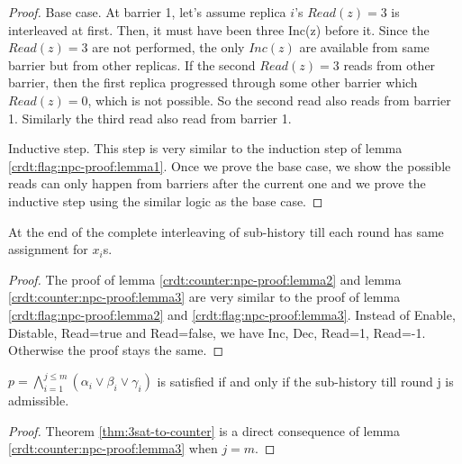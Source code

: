 \begin{proof}
  Base case. At barrier 1, let's assume replica $i$'s $Read(z) = 3$ is interleaved at first. Then, it must have been three Inc(z) before it. Since the $Read(z) = 3$ are not performed, the only $Inc(z)$ are available from same barrier but from other replicas. If the second $Read(z) = 3$ reads from other barrier, then the first replica progressed through some other barrier which $Read(z) = 0$, which is not possible. So the second read also reads from barrier 1. Similarly the third read also read from barrier 1.

  Inductive step. This step is very similar to the induction step of lemma \ref{crdt:flag:npc-proof:lemma1}. Once we prove the base case, we show the possible reads can only happen from barriers after the current one and we prove the inductive step using the similar logic as the base case. 
\end{proof}

\begin{lemma}
  \label{crdt:counter:npc-proof:lemma2}
  At the end of the complete interleaving of sub-history till each round has same assignment for $x_i$s.
\end{lemma}

\begin{proof}
  The proof of lemma \ref{crdt:counter:npc-proof:lemma2} and lemma \ref{crdt:counter:npc-proof:lemma3} are very similar to the proof of lemma \ref{crdt:flag:npc-proof:lemma2} and \ref{crdt:flag:npc-proof:lemma3}. Instead of Enable, Distable, Read=true and Read=false, we have Inc, Dec, Read=1, Read=-1. Otherwise the proof stays the same.
\end{proof}

\begin{lemma}
  \label{crdt:counter:npc-proof:lemma3}
  $p = \bigwedge_{i=1}^{j \leq m} (\alpha_i \lor \beta_i \lor \gamma_i)$ is satisfied if and only if the sub-history till round j is admissible.
\end{lemma}

\begin{proof}
  Theorem \ref{thm:3sat-to-counter} is a direct consequence of lemma \ref{crdt:counter:npc-proof:lemma3} when $j = m$. 
\end{proof}
